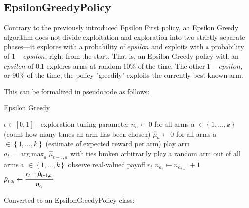 \documentclass{jss}\usepackage[]{graphicx}\usepackage[]{color}
\DeclareMathOperator*{\argmax}{arg\,max}
\begin{document}
\subsection{EpsilonGreedyPolicy}

Contrary to the previously introduced Epsilon First policy, an Epsilon Greedy algorithm \cite{Sutton1998e} does not divide exploitation and exploration into two strictly separate phases---it explores with a probability of $epsilon$ and exploits with a probability of $1-epsilon$, right from the start. That is, an Epsilon Greedy policy with an $epsilon$ of $0.1$ explores arms at random 10\% of the time. The other $1-epsilon$, or 90\% of the time, the policy "greedily" exploits the currently best-known arm.

This can be formalized in pseudocode as follows:

\begin{algorithm}[H]
\caption{Epsilon Greedy}
\label{Alg:EpsilonGreedy}
\begin{algorithmic}
\REQUIRE \(    \epsilon  \in \left[ 0,1 \right] \) - exploration tuning parameter
\STATE \( n_{a} \leftarrow 0 \) for all arms a \(  \in \left\{ 1, \dots, k \right\} \)  (count how many times an arm has been chosen)
\STATE \( \hat{\mu}_{a} \leftarrow 0 \) for all arms a  \(   \in \left\{ 1, \dots, k \right\} \)  (estimate of expected reward per arm)
		\STATE play arm \(a_t = \argmax_a  \hat{\mu}_{t-1,a}  \) with ties broken arbitrarily
	\ELSE
		\STATE play a random arm out of all arms a \(  \in \left\{ 1, \dots, k \right\} \)
	\ENDIF
	\STATE observe real-valued payoff $r_t$
	\STATE \( n_{a_{t}} \leftarrow n_{a_{t-1}} + 1  \)
   \STATE \( \hat{\mu}_{t,a_{t}} \leftarrow   \cfrac{r_t - \hat{\mu}_{t-1,a_{t}} }{n_{a_{t}}}   \)
\ENDFOR
\end{algorithmic}
\end{algorithm}

Converted to an EpsilonGreedyPolicy class:
\end{document}
